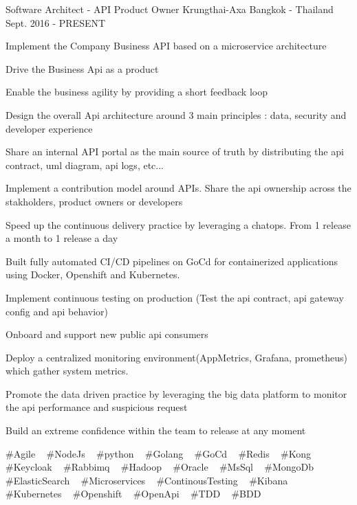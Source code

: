 

\begin{cventries}

  \cventry
    {Software Architect - API Product Owner} %
    {Krungthai-Axa} %
    {Bangkok - Thailand} %
    {Sept. 2016 - PRESENT} %
    {
      \begin{cvitems} %
        \item {Implement the Company Business API based on a microservice architecture}
        \item {Drive the Business Api as a product}
        \item {Enable the business agility by providing a short feedback loop}
        \item {Design the overall Api architecture around 3 main principles : data, security and developer experience}
        \item {Share an internal API portal as the main source of truth by distributing the api contract, uml diagram, api logs, etc...}
        \item {Implement a contribution model around APIs. Share the api ownership across the stakholders, product owners or developers}
        \item {Speed up the continuous delivery practice by leveraging a chatops. From 1 release a month to 1 release a day}
        \item {Built fully automated CI/CD pipelines on GoCd for containerized applications using Docker, Openshift and Kubernetes.}
        \item {Implement continuous testing on production (Test the api contract, api gateway config and api behavior)}
        \item {Onboard and support new public api consumers}
        \item {Deploy a centralized monitoring environment(AppMetrics, Grafana, prometheus) which gather system metrics.}
        \item {Promote the data driven practice by leveraging the big data platform to monitor the api performance and suspicious request}
        \item {Build an extreme confidence within the team to release at any moment}
      \end{cvitems}
    }
    {
      \#Agile ~
      \#NodeJs ~
      \#python ~
      \#Golang ~
      \#GoCd ~
      \#Redis ~
      \#Kong ~
      \#Keycloak ~
      \#Rabbimq ~
      \#Hadoop ~
      \#Oracle ~
      \#MsSql ~
      \#MongoDb ~
      \#ElasticSearch ~
      \#Microservices ~
      \#ContinousTesting ~
      \#Kibana ~
      \#Kubernetes ~
      \#Openshift ~
      \#OpenApi ~
      \#TDD ~
      \#BDD
    }


\end{cventries}
